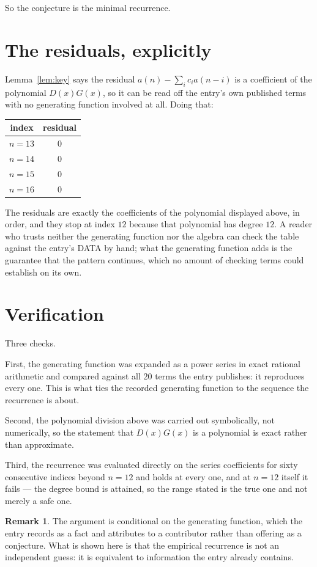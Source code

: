 \documentclass[11pt,a4paper]{article}
\theoremstyle{plain}
\theoremstyle{definition}
\newtheorem{remark}[theorem]{Remark}
\begin{document}
So the conjecture is the minimal recurrence.

\section{The residuals, explicitly}

Lemma~\ref{lem:key} says the residual $a(n)-\sum_ic_ia(n-i)$ is a coefficient of the
polynomial $D(x)G(x)$, so it can be read off the entry's own published terms with no
generating function involved at all. Doing that:
\begin{center}
\begin{tabular}{cc}
index & residual \\ \hline
$n=13$ & $0$ \\
$n=14$ & $0$ \\
$n=15$ & $0$ \\
$n=16$ & $0$
\end{tabular}
\end{center}
The residuals are exactly the coefficients of the polynomial displayed above, in order, and
they stop at index $12$ because that polynomial has degree $12$. A reader who trusts
neither the generating function nor the algebra can check the table against the entry's DATA
by hand; what the generating function adds is the guarantee that the pattern continues, which
no amount of checking terms could establish on its own.

\section{Verification}

Three checks.

First, the generating function was expanded as a power series in exact rational arithmetic and
compared against all $20$ terms the entry publishes: it reproduces every one. This is
what ties the recorded generating function to the sequence the recurrence is about.

Second, the polynomial division above was carried out symbolically, not numerically, so the
statement that $D(x)G(x)$ is a polynomial is exact rather than approximate.

Third, the recurrence was evaluated directly on the series coefficients for sixty consecutive
indices beyond $n=12$ and holds at every one, and at $n=12$ itself it fails --- the
degree bound is attained, so the range stated is the true one and not merely a safe one.

\begin{remark}
The argument is conditional on the generating function, which the entry records as a fact and
attributes to a contributor rather than offering as a conjecture. What is shown here is that
the empirical recurrence is not an independent guess: it is equivalent to information the
entry already contains.
\end{remark}
\end{document}
